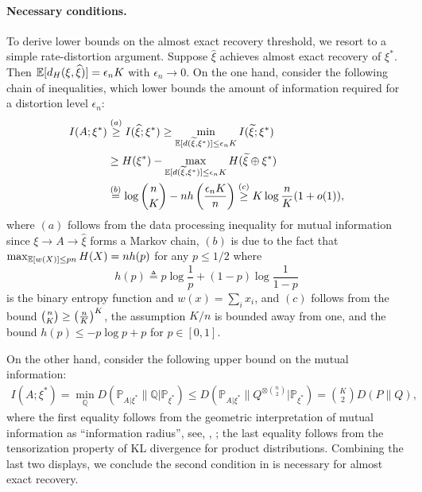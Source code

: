 \paragraph{Necessary conditions.} 
To derive lower bounds on the  almost exact recovery threshold, we resort to
a simple rate-distortion argument. Suppose $\hat \xi$ achieves almost exact recovery
of $\xi^*$. Then $\mathbb{E}[d_H(\xi, \widehat \xi)] = \epsilon_n K$ with $\epsilon_n\to 0$. 
On the one hand, consider the following chain of inequalities,
which lower bounds the amount of information required for a distortion level $\epsilon_n$:
\begin{align*}
I(A; \xi^* ) & \overset{(a)}{\geq} I(\widehat \xi; \xi^* )  \geq \min_{\mathbb{E}[d(\widetilde\xi,\xi^*)] \leq \epsilon_n K} I(\widetilde \xi; \xi^* )   \\
 & \geq H(\xi^* )- \max_{\mathbb{E}[d(\widetilde\xi,\xi^*)] \leq \epsilon_n K}  H( \widetilde\xi \oplus \xi^* ) \\
& \overset{(b)}{=} 
\log \binom{n}{K} - n h\left( \frac{\epsilon_n K}{n} \right) \overset{(c)} {\ge } K \log \frac{n}{K} (1+o(1)),
\end{align*}
 where $(a)$ follows from the data processing inequality for mutual information since $\xi\to A \to \hat\xi$ forms a Markov chain, $(b)$ is due 
 to the fact that $\max_{\mathbb{E}[w(X)] \leq p n } H(X) = nh(p)$ for any $p \leq 1/2$ where 
\begin{equation}
h(p) \triangleq p \log \frac{1}{p} + (1-p) \log \frac{1}{1-p}
\label{eq:binaryentropy}
\end{equation}
 is the binary entropy function and $w(x)=\sum_i x_i$,
and $(c)$ follows from the  bound $\binom{n}{K}  \geq \left(  \frac{n}{K}  \right)^K$, 
the assumption $K/n$ is bounded away from one, and the bound $h(p) \leq -p\log p + p$ for $p\in [0,1]$.
 
 
On the other hand, consider the following upper bound on the mutual information: 
\begin{align*}
I(A; \xi^* )
= \min_\mathbb{Q} D({ \mathbb{P}_{A|\xi^* } } \| \mathbb{Q} |\mathbb{P}_{\xi^* })	
\leq D({ \mathbb{P}_{A|\xi^* } } \|Q^{\otimes \binom{n}{2}} |\mathbb{P}_{\xi^* })  
=  	\binom{K}{2} D(P \| Q),  
\end{align*}
where the first equality follows from the geometric interpretation of mutual information as ``information radius'', see, \eg, \cite[Corollary 3.1]{PW-it};
the last equality follows from the  tensorization property of KL divergence for product distributions.
Combining the last two displays, we conclude the 
second condition in  is necessary for almost exact recovery. 

